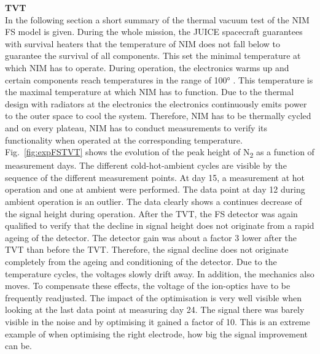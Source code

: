 	
		\textbf{TVT}\\ %
		In the following section a short summary of the thermal vacuum test of the NIM FS model is given. During the whole mission, the JUICE spacecraft guarantees with survival heaters that the temperature of NIM does not fall below  to guarantee the survival of all components. This set the minimal temperature at which NIM has to operate. During operation, the electronics warms up and certain components reach temperatures in the range of 100° . This temperature is the maximal temperature at which NIM has to function. Due to the thermal design with radiators at the electronics the electronics continuously emits power to the outer space to cool the system. %
		Therefore, NIM has to be thermally cycled and on every plateau, NIM has to conduct measurements to verify its functionality when operated at the corresponding temperature.\\ %
		Fig.~\ref{fig:expFSTVT} shows the evolution of the peak height of N\textsubscript{2} as a function of measurement days. The different cold-hot-ambient cycles are visible by the sequence of the different measurement points. At day 15, a measurement at hot operation and one at ambient were performed. The data point at day 12 during ambient operation is an outlier. The data clearly shows a continues decrease of the signal height during operation. After the TVT, the FS detector was again qualified to verify that the decline in signal height does not originate from a rapid ageing of the detector. The detector gain was about a factor 3 lower after the TVT than before the TVT. Therefore, the signal decline does not originate completely from the ageing and conditioning of the detector. Due to the temperature cycles, the voltages slowly drift away. In addition, the mechanics also moves. To compensate these effects, the voltage of the ion-optics have to be frequently readjusted. The impact of the optimisation is very well visible when looking at the last data point at measuring day 24. The signal there was barely visible in the noise and by optimising it gained a factor of 10. This is an extreme example of when optimising the right electrode, how big the signal improvement can be.\\
